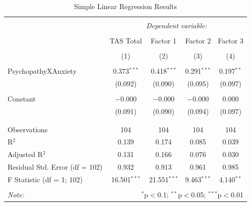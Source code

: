 \documentclass[
  man,floatsintext]{apa6}
\begin{document}
\begin{table}[!htbp] \centering 
  \caption{Simple Linear Regression Results} 
  \label{} 
\begin{tabular}{@{\extracolsep{1pt}}lcccc} 
\\[-1.8ex]\hline 
\hline \\[-1.8ex] 
 & \multicolumn{4}{c}{\textit{Dependent variable:}} \\ 
\cline{2-5} 
\\[-1.8ex] & TAS Total & Factor 1 & Factor 2 & Factor 3 \\ 
\\[-1.8ex] & (1) & (2) & (3) & (4)\\ 
\hline \\[-1.8ex] 
 PsychopathyXAnxiety & 0.373$^{***}$ & 0.418$^{***}$ & 0.291$^{***}$ & 0.197$^{**}$ \\ 
  & (0.092) & (0.090) & (0.095) & (0.097) \\ 
  & & & & \\ 
 Constant & $-$0.000 & $-$0.000 & $-$0.000 & 0.000 \\ 
  & (0.091) & (0.090) & (0.094) & (0.097) \\ 
  & & & & \\ 
\hline \\[-1.8ex] 
Observations & 104 & 104 & 104 & 104 \\ 
R$^{2}$ & 0.139 & 0.174 & 0.085 & 0.039 \\ 
Adjusted R$^{2}$ & 0.131 & 0.166 & 0.076 & 0.030 \\ 
Residual Std. Error (df = 102) & 0.932 & 0.913 & 0.961 & 0.985 \\ 
F Statistic (df = 1; 102) & 16.501$^{***}$ & 21.551$^{***}$ & 9.463$^{***}$ & 4.140$^{**}$ \\ 
\hline 
\hline \\[-1.8ex] 
\textit{Note:}  & \multicolumn{4}{r}{$^{*}$p$<$0.1; $^{**}$p$<$0.05; $^{***}$p$<$0.01} \\ 
\end{tabular} 
\end{table}
\end{document}
